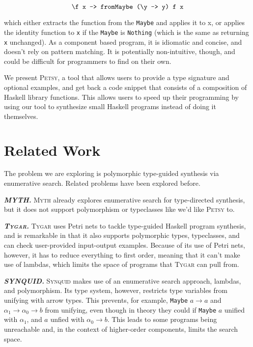 \documentclass[acmsmall,nonacm]{acmart}
\begin{document}
\begin{equation}
  \label{solution1}
  \verb|\f x -> fromMaybe (\y -> y) f x|
\end{equation}

\noindent which either extracts the function from the \verb|Maybe| and applies it to x, 
or applies the identity function to \verb|x| if the \verb|Maybe| is \verb|Nothing|
(which is the same as returning \verb|x| unchanged). As a component based program,
it is idiomatic and concise, and doesn't rely on pattern matching.  
It is potentially non-intuitive, though, and could be difficult 
for programmers to find on their own. 


We present \textsc{Petsy}, a tool that allows users to provide a type signature and 
optional examples, and get back a code snippet 
that consists of a composition of Haskell library functions. This allows
users to speed up their programming by using our tool to synthesize small 
Haskell programs instead of doing it themselves. 




\section{Related Work}

The problem we are exploring is polymorphic type-guided synthesis via 
enumerative search. Related problems have been explored before. 

\vspace{2mm}
\noindent \textbf{\textit{MYTH.}} \textsc{Myth} \cite{myth}
already explores enumerative search for 
type-directed synthesis, but it does not support polymorphism or typeclasses 
like we'd like \textsc{Petsy} to. 

\vspace{2mm}
\noindent \textbf{\textit{\textsc{Tygar}.}} \textsc{Tygar} \cite{tygar} uses Petri nets to 
tackle type-guided Haskell program synthesis, and is remarkable in that 
it also supports polymorphic types, typeclasses, and can check 
user-provided input-output examples. Because of its use of Petri nets, 
however, it has to reduce everything to first order, meaning that 
it can't make use of lambdas, which limits the space of programs that
\textsc{Tygar} can pull from.

\vspace{2mm}
\noindent \textbf{\textit{SYNQUID.}} \textsc{Synquid} \cite{synquid} makes 
use of an enumerative search approach, lambdas, and polymorphism. 
Its type system, however, restricts type variables
from unifying with arrow types. This prevents, for example, 
\texttt{Maybe} ${a \to a}$ 
and ${\alpha_1 \to \alpha_0 \to b}$ from unifying, even though in theory
they could if \texttt{Maybe} $a$ unified with $\alpha_1$, and $a$ unfied 
with $\alpha_0 \to b$. This leads to some programs being unreachable
and, in the context of higher-order components, limits the search space. 
\end{document}
